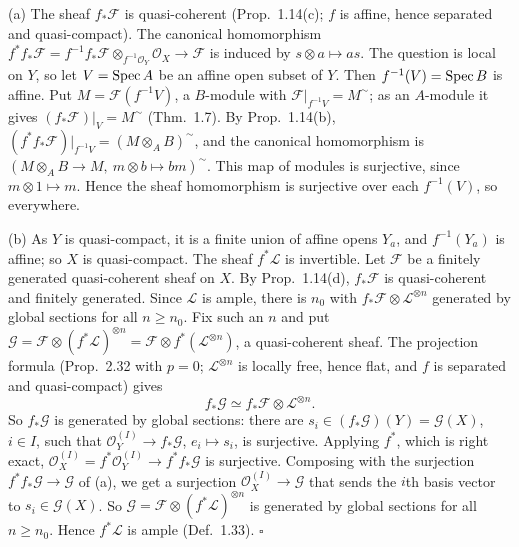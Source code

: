 \documentclass[11pt]{article}
\begin{document}
\pf
(a) The sheaf $f_*\mathcal F$ is quasi-coherent (Prop.~1.14(c); $f$ is affine, hence separated and quasi-compact). The canonical homomorphism $f^*f_*\mathcal F=f^{-1}f_*\mathcal F\otimes_{f^{-1}\mathcal O_Y}\mathcal O_X\to\mathcal F$ is induced by $s\otimes a\mapsto as$. The question is local on $Y$, so let $V=\operatorname{Spec} A$ be an affine open subset of $Y$. Then $f^{-1}(V)=\operatorname{Spec} B$ is affine. Put $M=\mathcal F(f^{-1}V)$, a $B$-module with $\mathcal F|_{f^{-1}V}=M^\sim$; as an $A$-module it gives $(f_*\mathcal F)|_V=M^\sim$ (Thm.~1.7). By Prop.~1.14(b), $(f^*f_*\mathcal F)|_{f^{-1}V}=(M\otimes_AB)^\sim$, and the canonical homomorphism is $(M\otimes_AB\to M,\ m\otimes b\mapsto bm)^\sim$. This map of modules is surjective, since $m\otimes1\mapsto m$. Hence the sheaf homomorphism is surjective over each $f^{-1}(V)$, so everywhere.

(b) As $Y$ is quasi-compact, it is a finite union of affine opens $Y_a$, and $f^{-1}(Y_a)$ is affine; so $X$ is quasi-compact. The sheaf $f^*\mathcal L$ is invertible. Let $\mathcal F$ be a finitely generated quasi-coherent sheaf on $X$. By Prop.~1.14(d), $f_*\mathcal F$ is quasi-coherent and finitely generated. Since $\mathcal L$ is ample, there is $n_0$ with $f_*\mathcal F\otimes\mathcal L^{\otimes n}$ generated by global sections for all $n\ge n_0$. Fix such an $n$ and put $\mathcal G=\mathcal F\otimes(f^*\mathcal L)^{\otimes n}=\mathcal F\otimes f^*(\mathcal L^{\otimes n})$, a quasi-coherent sheaf. The projection formula (Prop.~2.32 with $p=0$; $\mathcal L^{\otimes n}$ is locally free, hence flat, and $f$ is separated and quasi-compact) gives
\[ f_*\mathcal G\simeq f_*\mathcal F\otimes\mathcal L^{\otimes n}. \]
So $f_*\mathcal G$ is generated by global sections: there are $s_i\in(f_*\mathcal G)(Y)=\mathcal G(X)$, $i\in I$, such that $\mathcal O_Y^{(I)}\to f_*\mathcal G$, $e_i\mapsto s_i$, is surjective. Applying $f^*$, which is right exact, $\mathcal O_X^{(I)}=f^*\mathcal O_Y^{(I)}\to f^*f_*\mathcal G$ is surjective. Composing with the surjection $f^*f_*\mathcal G\to\mathcal G$ of (a), we get a surjection $\mathcal O_X^{(I)}\to\mathcal G$ that sends the $i$th basis vector to $s_i\in\mathcal G(X)$. So $\mathcal G=\mathcal F\otimes(f^*\mathcal L)^{\otimes n}$ is generated by global sections for all $n\ge n_0$. Hence $f^*\mathcal L$ is ample (Def.~1.33). \hfill$\square$
\end{document}
